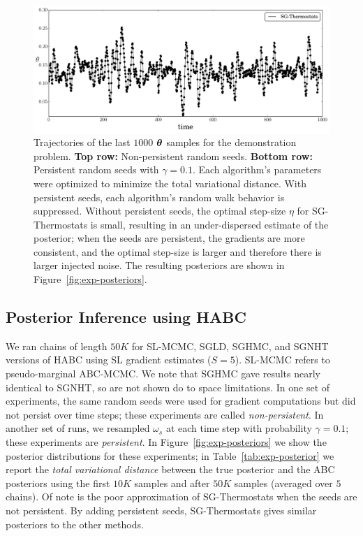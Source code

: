 \documentclass[]{article}
\begin{document}
\begin{figure}[t]
\begin{center}
\includegraphics[width=0.65\columnwidth]{./images/exponential/exp2-SG-Thermostats-theta-timeseries-omega-rate-0p1-chain3.pdf}
\vspace{-0.15in}
\caption{\small{Trajectories of the last $1000$ ${\bm \theta}$ samples for the demonstration problem.  {\bf Top row:} Non-persistent random seeds.  {\bf Bottom row:} Persistent random seeds with $\gamma = 0.1$.  Each algorithm's parameters were optimized to minimize the total variational distance.  With persistent seeds, each algorithm's random walk behavior is suppressed.  Without persistent seeds, the optimal step-size $\eta$ for SG-Thermostats is small, resulting in an under-dispersed estimate of the posterior; when the seeds are persistent, the gradients are more consistent, and the optimal step-size is larger and therefore there is larger injected noise.  The resulting posteriors are shown in Figure~\ref{fig:exp-posteriors}.
}}
\label{fig:exp-theta-traces}
\end{center}
\vspace{-0.1in}
\end{figure}

\subsection{Posterior Inference using HABC}
We ran chains of length $50K$ for SL-MCMC, SGLD, SGHMC, and SGNHT versions of HABC using SL gradient estimates ($S=5$).  SL-MCMC refers to pseudo-marginal ABC-MCMC.  We note that SGHMC gave results nearly identical to SGNHT, so are not shown do to space limitations.   In one set of experiments, the same random seeds were used for gradient computations but did not persist over time steps; these experiments are called {\em non-persistent}.  In another set of runs, we resampled $\omega_s$ at each time step with probability $\gamma = 0.1$; these experiments are {\em persistent}.  In Figure~\ref{fig:exp-posteriors} we show the posterior distributions for these experiments; in Table~\ref{tab:exp-posterior} we report the {\em total variational distance} between the true posterior and the ABC posteriors using the first $10K$ samples and after $50K$ samples (averaged over $5$ chains).  Of note is the poor approximation of SG-Thermostats when the seeds are not persistent.  By adding persistent seeds, SG-Thermostats gives similar posteriors to the other methods.
\end{document}
